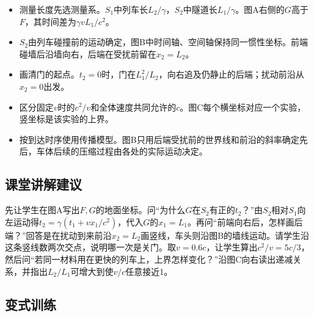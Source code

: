 \documentclass[UTF8,fontset=fandol,a4paper,11pt]{ctexart}
\begin{document}
\begin{itemize}
\item 测量长度先选测量系。$S_1$中列车长$L_2/\gamma$，$S_2$中隧道长$L_1/\gamma$。图A右侧的$G$高于$F$，其时间差为$\gamma vL_1/c^2$。
\item $S_2$由列车碰撞前的运动确定，图B中时间轴、空间轴保持同一惯性坐标。前端碰墙后沿墙向右，后端在受扰前留在$x_2=L_2$。
\item 画清门的起点。$t_2=0$时，门在$L_1^2/L_2$，向右追及仍静止的后端；扰动前沿从$x_2=0$出发。
\item 区分固定$v$时的$c^2/v$和全体速度共同允许的$c$。图C每个横坐标对应一个实验，竖坐标是该实验的上界。
\item 按到达时序使用传播模型。图B只用后端受扰前的世界线和前沿的斜率确定先后，车体后续的压缩过程由各处的实际运动决定。
\end{itemize}



\subsection*{课堂讲解建议}

先让学生在图A写出$F,G$的地面坐标。问“为什么$G$在$S_2$有正的$t_2$？”由$S_2$相对$S_1$向左运动得$t_2=\gamma(t_1+vx_1/c^2)$，代入$G$的$x_1=L_1$。再问“前端向右后，怎样画后端？”回答是在扰动到来前沿$x_2=L_2$画竖线，车头则沿图B的墙线运动。请学生沿这条竖线数两次交点，说明哪一次是关门。取$v=0.6c$，让学生算出$c^2/v=5c/3$，然后问“若同一材料用在更快的列车上，上界怎样变化？”沿图C向右读出递减关系，并指出$L_2/L_1$可增大到使$v/c$任意接近1。



\subsection*{变式训练}
\end{document}
